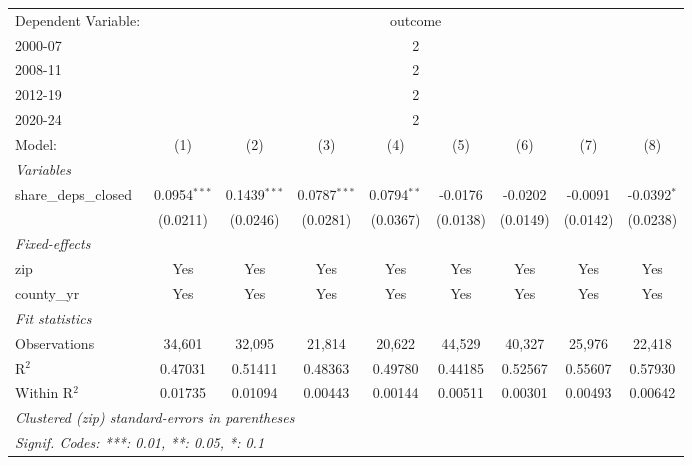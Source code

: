\begingroup
\centering
\begin{tabular}{lcccccccc}
   \tabularnewline \midrule \midrule
   Dependent Variable: & \multicolumn{8}{c}{outcome}\\
   2000-07 & \multicolumn{8}{c}{2} \\ 
   2008-11 & \multicolumn{8}{c}{2} \\ 
   2012-19 & \multicolumn{8}{c}{2} \\ 
   2020-24 & \multicolumn{8}{c}{2} \\ 
   Model:                & (1)            & (2)            & (3)            & (4)           & (5)      & (6)      & (7)      & (8)\\  
   \midrule
   \emph{Variables}\\
   share\_deps\_closed   & 0.0954$^{***}$ & 0.1439$^{***}$ & 0.0787$^{***}$ & 0.0794$^{**}$ & -0.0176  & -0.0202  & -0.0091  & -0.0392$^{*}$\\   
                         & (0.0211)       & (0.0246)       & (0.0281)       & (0.0367)      & (0.0138) & (0.0149) & (0.0142) & (0.0238)\\   
   \midrule
   \emph{Fixed-effects}\\
   zip                   & Yes            & Yes            & Yes            & Yes           & Yes      & Yes      & Yes      & Yes\\  
   county\_yr            & Yes            & Yes            & Yes            & Yes           & Yes      & Yes      & Yes      & Yes\\  
   \midrule
   \emph{Fit statistics}\\
   Observations          & 34,601         & 32,095         & 21,814         & 20,622        & 44,529   & 40,327   & 25,976   & 22,418\\  
   R$^2$                 & 0.47031        & 0.51411        & 0.48363        & 0.49780       & 0.44185  & 0.52567  & 0.55607  & 0.57930\\  
   Within R$^2$          & 0.01735        & 0.01094        & 0.00443        & 0.00144       & 0.00511  & 0.00301  & 0.00493  & 0.00642\\  
   \midrule \midrule
   \multicolumn{9}{l}{\emph{Clustered (zip) standard-errors in parentheses}}\\
   \multicolumn{9}{l}{\emph{Signif. Codes: ***: 0.01, **: 0.05, *: 0.1}}\\
\end{tabular}
\par\endgroup
